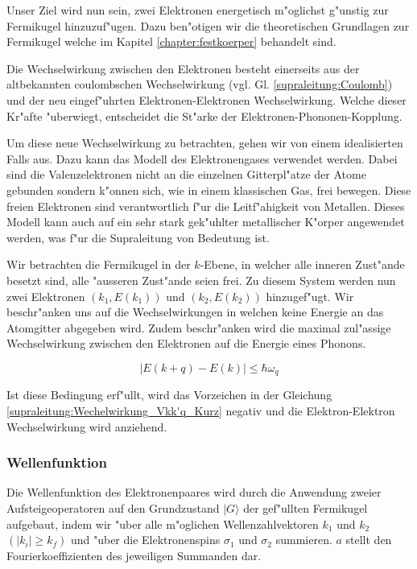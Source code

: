 \begin{refsection}
Unser Ziel wird nun sein, zwei Elektronen energetisch m"oglichst g"unstig zur Fermikugel hinzuzuf"ugen.
Dazu ben"otigen wir die theoretischen Grundlagen zur Fermikugel welche im Kapitel
\ref{chapter:festkoerper} behandelt sind.


Die Wechselwirkung zwischen den Elektronen besteht einerseits aus der altbekannten coulombschen
Wechselwirkung (vgl. Gl. \ref{supraleitung:Coulomb}) und der neu eingef"uhrten
Elektronen-Elektronen Wechselwirkung.
Welche dieser Kr"afte "uberwiegt, entscheidet die St"arke der Elektronen-Phononen-Kopplung.

Um diese neue Wechselwirkung zu betrachten, gehen wir von einem idealisierten Falls aus.
Dazu kann das Modell des Elektronengases verwendet werden.
Dabei sind die Valenzelektronen nicht an die einzelnen Gitterpl"atze der Atome gebunden sondern k"onnen sich,
wie in einem klassischen Gas, frei bewegen.
Diese freien Elektronen sind verantwortlich f"ur die Leitf"ahigkeit von Metallen.
Dieses Modell kann auch auf ein sehr stark gek"uhlter metallischer K"orper angewendet werden,
was f"ur die Supraleitung von Bedeutung ist.

Wir betrachten die Fermikugel in der $k$-Ebene, in welcher alle inneren Zust"ande besetzt sind,
alle "ausseren Zust"ande seien frei.
Zu diesem System werden nun zwei Elektronen $(k_1,E(k_1))$ und $(k_2,E(k_2))$ hinzugef"ugt.
Wir beschr"anken uns auf die Wechselwirkungen in welchen keine Energie an das Atomgitter abgegeben wird.
Zudem beschr"anken wird die maximal zul"assige Wechselwirkung zwischen den Elektronen auf die
Energie eines Phonons.

\begin{equation}
|E(k+q)-E(k)|\le\hbar\omega_q
\label{supraleitung:Phonon Energie}
\end{equation}

Ist diese Bedingung erf"ullt, wird das Vorzeichen in der Gleichung \ref{supraleitung:Wechelwirkung_Vkk'q_Kurz} negativ und die Elektron-Elektron Wechselwirkung wird anziehend.

\subsubsection{Wellenfunktion}
Die Wellenfunktion des Elektronenpaares wird durch die Anwendung zweier Aufsteigeoperatoren
auf den Grundzustand $|G\rangle$ der gef"ullten Fermikugel aufgebaut, indem wir "uber
alle m"oglichen Wellenzahlvektoren $k_1$ und $k_2$ $(|k_i| \ge k_f)$ und "uber
die Elektronenspins $\sigma_1$ und $\sigma_2$ summieren.
$a$ stellt den Fourierkoeffizienten des jeweiligen Summanden dar.


\end{refsection}
